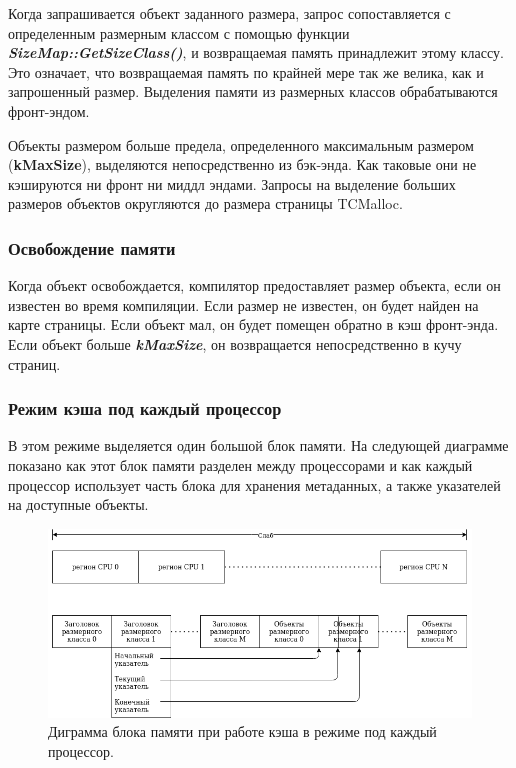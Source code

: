Когда запрашивается объект заданного размера, запрос сопоставляется с определенным размерным классом с помощью функции \textit{\textbf{SizeMap::GetSizeClass()}}, и возвращаемая память принадлежит этому классу. Это означает, что возвращаемая память по крайней мере так же велика, как и запрошенный размер. Выделения памяти из размерных классов обрабатываются фронт-эндом.

Объекты размером больше предела, определенного максимальным размером (\textbf{kMaxSize}), выделяются непосредственно из бэк-энда. Как таковые они не кэшируются ни фронт ни миддл эндами. Запросы на выделение больших размеров объектов округляются до размера страницы TCMalloc.

\subsubsection{Освобождение памяти}

Когда объект освобождается, компилятор предоставляет размер объекта, если он известен во время компиляции. Если размер не известен, он будет найден на карте страницы. Если объект мал, он будет помещен обратно в кэш фронт-энда. Если объект больше \textbf{\textit{kMaxSize}}, он возвращается непосредственно в кучу страниц.

\subsubsection{Режим кэша под каждый процессор}

В этом режиме выделяется один большой блок памяти. На следующей диаграмме показано как этот блок памяти разделен между процессорами и как каждый процессор использует часть блока для хранения метаданных, а также указателей на доступные объекты.

\begin{figure}[!h]
	\begin{center}
		\includegraphics[scale=0.6]{images/tcmalloc-per-cpu.png}
		\caption{Диграмма блока памяти при работе кэша в режиме под каждый процессор.}
		\label{tcmalloc-per-cpu}
	\end{center}
\end{figure}

